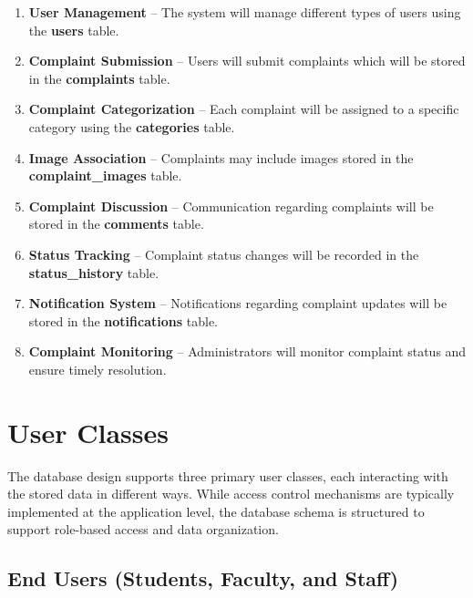 \documentclass[12pt,a4paper]{article}
\begin{document}
\begin{enumerate}

\item \textbf{User Management} – The system will manage different types of users using the \textbf{users} table.

\item \textbf{Complaint Submission} – Users will submit complaints which will be stored in the \textbf{complaints} table.

\item \textbf{Complaint Categorization} – Each complaint will be assigned to a specific category using the \textbf{categories} table.

\item \textbf{Image Association} – Complaints may include images stored in the \textbf{complaint\_images} table.

\item \textbf{Complaint Discussion} – Communication regarding complaints will be stored in the \textbf{comments} table.

\item \textbf{Status Tracking} – Complaint status changes will be recorded in the \textbf{status\_history} table.

\item \textbf{Notification System} – Notifications regarding complaint updates will be stored in the \textbf{notifications} table.

\item \textbf{Complaint Monitoring} – Administrators will monitor complaint status and ensure timely resolution.

\end{enumerate}



\section{User Classes}

The database design supports three primary user classes, each interacting with the stored data in different ways. While access control mechanisms are typically implemented at the application level, the database schema is structured to support role-based access and data organization.

\subsection{End Users (Students, Faculty, and Staff)}
\end{document}
